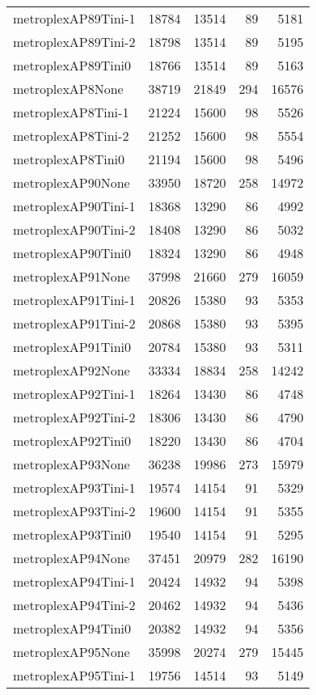 \begin{longtable}{lrrrr}
metroplexAP89Tini-1 & 18784 & 13514 & 89 & 5181 \\
metroplexAP89Tini-2 & 18798 & 13514 & 89 & 5195 \\
metroplexAP89Tini0 & 18766 & 13514 & 89 & 5163 \\
metroplexAP8None & 38719 & 21849 & 294 & 16576 \\
metroplexAP8Tini-1 & 21224 & 15600 & 98 & 5526 \\
metroplexAP8Tini-2 & 21252 & 15600 & 98 & 5554 \\
metroplexAP8Tini0 & 21194 & 15600 & 98 & 5496 \\
metroplexAP90None & 33950 & 18720 & 258 & 14972 \\
metroplexAP90Tini-1 & 18368 & 13290 & 86 & 4992 \\
metroplexAP90Tini-2 & 18408 & 13290 & 86 & 5032 \\
metroplexAP90Tini0 & 18324 & 13290 & 86 & 4948 \\
metroplexAP91None & 37998 & 21660 & 279 & 16059 \\
metroplexAP91Tini-1 & 20826 & 15380 & 93 & 5353 \\
metroplexAP91Tini-2 & 20868 & 15380 & 93 & 5395 \\
metroplexAP91Tini0 & 20784 & 15380 & 93 & 5311 \\
metroplexAP92None & 33334 & 18834 & 258 & 14242 \\
metroplexAP92Tini-1 & 18264 & 13430 & 86 & 4748 \\
metroplexAP92Tini-2 & 18306 & 13430 & 86 & 4790 \\
metroplexAP92Tini0 & 18220 & 13430 & 86 & 4704 \\
metroplexAP93None & 36238 & 19986 & 273 & 15979 \\
metroplexAP93Tini-1 & 19574 & 14154 & 91 & 5329 \\
metroplexAP93Tini-2 & 19600 & 14154 & 91 & 5355 \\
metroplexAP93Tini0 & 19540 & 14154 & 91 & 5295 \\
metroplexAP94None & 37451 & 20979 & 282 & 16190 \\
metroplexAP94Tini-1 & 20424 & 14932 & 94 & 5398 \\
metroplexAP94Tini-2 & 20462 & 14932 & 94 & 5436 \\
metroplexAP94Tini0 & 20382 & 14932 & 94 & 5356 \\
metroplexAP95None & 35998 & 20274 & 279 & 15445 \\
metroplexAP95Tini-1 & 19756 & 14514 & 93 & 5149 \\

\end{longtable}
